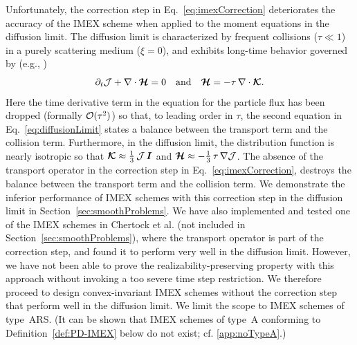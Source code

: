 Unfortunately, the correction step in Eq.~\eqref{eq:imexCorrection} deteriorates the accuracy of the IMEX scheme when applied to the moment equations in the diffusion limit.  
The diffusion limit is characterized by frequent collisions ($\tau\ll 1$) in a purely scattering medium ($\xi=0$), and exhibits long-time behavior governed by (e.g., \cite{jinLevermore_1996})
\begin{equation}
  \partial_{t}{\mathcal{J}} + \nabla\cdot\boldsymbol{\mathcal{H}} = 0
  \quad\text{and}\quad
  \boldsymbol{\mathcal{H}} = - \tau\,\nabla\cdot\boldsymbol{\mathcal{K}}.  
  \label{eq:diffusionLimit}
\end{equation}
Here the time derivative term in the equation for the particle flux has been dropped (formally $\mathcal{O}(\tau^{2})$) so that, to leading order in $\tau$, the second equation in Eq.~\eqref{eq:diffusionLimit} states a balance between the transport term and the collision term.  
Furthermore, in the diffusion limit, the distribution function is nearly isotropic so that $\boldsymbol{\mathcal{K}}\approx\frac{1}{3}\,\mathcal{J}\,\boldsymbol{I}$ and $\boldsymbol{\mathcal{H}}\approx-\frac{1}{3}\,\tau\,\nabla\mathcal{J}$.  
The absence of the transport operator in the correction step in Eq.~\eqref{eq:imexCorrection}, destroys the balance between the transport term and the collision term.  
We demonstrate the inferior performance of IMEX schemes with this correction step in the diffusion limit in Section~\ref{sec:smoothProblems}.  
We have also implemented and tested one of the IMEX schemes in Chertock et al. \cite{chertock_etal_2015} (not included in Section~\ref{sec:smoothProblems}), where the transport operator is part of the correction step, and found it to perform very well in the diffusion limit.  
However, we have not been able to prove the realizability-preserving property with this approach without invoking a too severe time step restriction.  
We therefore proceed to design convex-invariant IMEX schemes without the correction step that perform well in the diffusion limit.  
We limit the scope to IMEX schemes of type~ARS.  
(It can be shown that IMEX schemes of type~A conforming to Definition~\ref{def:PD-IMEX} below do not exist; cf. \ref{app:noTypeA}.)

